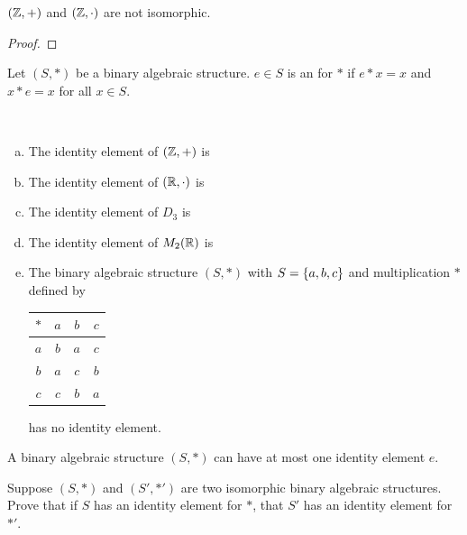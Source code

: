 \documentclass[11pt,fleqn,dvipsnames,usenames]{article}
\begin{document}
%
\begin{theorem}
$(\mathbb{Z},+)$ and $(\mathbb{Z},\cdot)$ are not isomorphic.
\end{theorem}
%
\begin{proof}
\end{proof}
\vspace{6cm}

%
\begin{definition}
Let $(S,*)$ be a binary algebraic structure.  $e\in S$ is an  for $*$ if $e*x = x$ and $x*e = x$ for all $x\in S$.
\end{definition}
%
\begin{examples}~
\begin{enumerate}[(a)]
\item The identity element of $(\mathbb{Z},+)$ is
\vspace{2cm}

\item The identity element of $(\mathbb{R},\cdot)$ is
\vspace{2cm}

\item The identity element of $D_3$ is
\vspace{2cm}

\item The identity element of $M_{2}(\mathbb{R})$ is
\vspace{2cm}

\item The binary algebraic structure $(S,*)$ with $S = \left\{a,b,c\right\}$ and multiplication $*$ defined by
\begin{center}
\begin{tabular}{c|ccc}
$*$ & $a$ & $b$ & $c$\\
\hline
$a$ & $b$ & $a$ & $c$\\
$b$ & $a$ & $c$ & $b$\\
$c$ & $c$ & $b$ & $a$\\
\end{tabular}
\end{center}
has no identity element.
\end{enumerate}
\end{examples}
%
\begin{remark}\label{uniqueidentities}
A binary algebraic structure $(S,*)$ can have at most one identity element $e$.
\end{remark}
\vspace{3cm}

%
\begin{exercise}
Suppose $(S,*)$ and $(S',*')$ are two isomorphic binary algebraic structures.  Prove that if $S$ has an identity element for $*$, that $S'$ has an identity element for $*'$.
\end{exercise}
\end{document}
